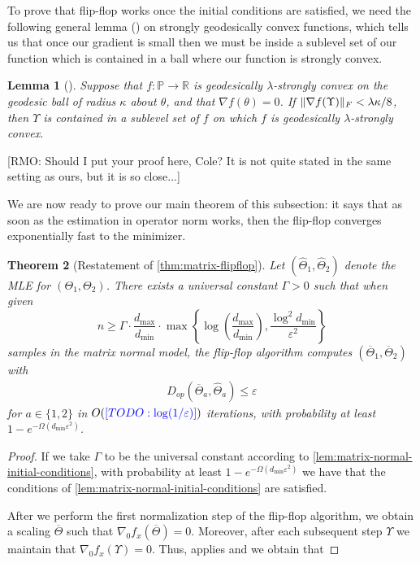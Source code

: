 \documentclass[aos]{imsart}
\newtheorem{theorem}{Theorem}[section]
\newtheorem{lemma}[theorem]{Lemma}
\theoremstyle{definition}
\numberwithin{equation}{section}
\DeclarePairedDelimiter{\norm}{\lVert}{\rVert}
\newcommand{\R}{{\mathbb{R}}}
\newcommand{\otheta}{\overline{\Theta}}
\newcommand{\eps}{\varepsilon}
\newcommand{\SPD}{\mathbb{P}}
\def\dmin{d_{\min}}
\def\dmax{d_{\max}}
\newcommand{\RMO}[1]{{\color{red}[RMO: #1]}}
\newcommand{\TODO}[1]{{\color{blue}[TODO: #1]}}
\begin{document}
To prove that flip-flop works once the initial conditions are satisfied, we need the following general lemma (\cite[Lemma 4.7]{FM20}) on strongly geodesically convex functions, which tells us that once our gradient is small then we must be inside a sublevel set of our function which is contained in a ball where our function is strongly convex. 

\begin{lemma}[\cite{FM20}]
Suppose that $f : \SPD \to \R$ is geodesically $\lambda$-strongly convex on the geodesic ball of radius $\kappa$ about $\theta$, and that $\nabla f(\theta) = 0$. 
If $\norm{\nabla f(\Upsilon)}_F < \lambda \kappa/8$, then $\Upsilon$ is contained in a sublevel set of $f$ on which $f$ is geodesically $\lambda$-strongly convex.
\end{lemma}

\RMO{Should I put your proof here, Cole? It is not quite stated in the same setting as ours, but it is so close...}

We are now ready to prove our main theorem of this subsection: it says that as soon as the estimation in operator norm works, then the flip-flop converges exponentially fast to the minimizer.

\begin{theorem}[Restatement of \cref{thm:matrix-flipflop}]
Let $(\widehat{\Theta}_1,\widehat{\Theta}_2)$ denote the MLE for $(\Theta_1,\Theta_2)$. There exists a universal constant $\Gamma > 0$ such that when given 
$$n \geq \Gamma \cdot \dfrac{\dmax}{\dmin} \cdot \max\left\{ \log\left( \dfrac{\dmax}{\dmin} \right), \dfrac{\log^2 \dmin}{\varepsilon^2} \right\}$$ 
samples in the matrix normal model, the flip-flop algorithm computes $(\overline{\Theta}_1,\overline{\Theta}_2)$ with
\begin{align*}
  D_{op}(\overline{\Theta}_a, \widehat{\Theta}_a) \leq \eps
\end{align*}
for $a\in\{1,2\}$ in $O(\TODO{\log(1/\eps)})$ iterations, with probability at least $1 - e^{- \Omega(\dmin \varepsilon^2)}$.
\end{theorem}

\begin{proof}
If we take $\Gamma$ to be the universal constant according to \cref{lem:matrix-normal-initial-conditions}, with probability at least $1 - e^{- \Omega(\dmin \varepsilon^2)}$ we have that the conditions of \cref{lem:matrix-normal-initial-conditions} are satisfied.

After we perform the first normalization step of the flip-flop algorithm, we obtain a scaling $\otheta$ such that $\nabla_0 f_x (\otheta) = 0$. 
Moreover, after each subsequent step $\Upsilon$ we maintain that $\nabla_0 f_x (\Upsilon) = 0$.
Thus,  applies and we obtain that 
\end{proof}
\end{document}
